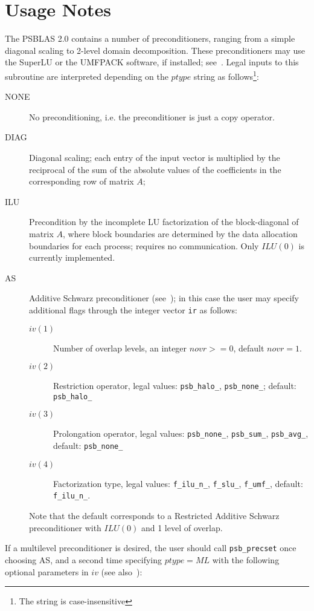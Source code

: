 \section*{Usage Notes}
The PSBLAS 2.0 contains a number of preconditioners, ranging from a
simple diagonal scaling to 2-level domain decomposition. These
preconditioners may use the SuperLU or the UMFPACK software, if
installed; see~\cite{SUPERLU,UMFPACK}. 
Legal inputs to this subroutine are interpreted depending on the
$ptype$ string as follows\footnote{The string is case-insensitive}:
\begin{description}
\item[NONE] No preconditioning, i.e. the preconditioner is just a copy
  operator.
\item[DIAG] Diagonal scaling; each entry of the input vector is
  multiplied by the reciprocal of the sum of the absolute values of
  the coefficients in the corresponding row of matrix  $A$;
\item[ILU] Precondition by the incomplete LU factorization of the
  block-diagonal of matrix $A$, where block boundaries are determined
  by the data allocation boundaries for each process; requires no
  communication. Only $ILU(0)$ is currently implemented. 
\item[AS] Additive Schwarz preconditioner (see~\cite{PARA04}); in this
  case the user may specify additional flags through the integer
  vector \verb|ir| as follows:
\begin{description}
\item[$iv(1)$] Number of overlap levels, an integer $novr>=0$, default
  $novr=1$.  
\item[$iv(2)$] Restriction operator, legal values: \verb|psb_halo_|,
  \verb|psb_none_|; default: \verb|psb_halo_|
\item[$iv(3)$] Prolongation operator, legal values: \verb|psb_none_|,
  \verb|psb_sum_|, \verb|psb_avg_|, default: \verb|psb_none_|
\item[$iv(4)$] Factorization type, legal values: \verb|f_ilu_n_|,
  \verb|f_slu_|, \verb|f_umf_|, default: \verb|f_ilu_n_|.
\end{description}
Note that the default corresponds to a Restricted Additive Schwarz
preconditioner with $ILU(0)$ and 1 level of overlap.
\end{description}
If a multilevel preconditioner is desired, the user should call
\verb|psb_precset| once choosing AS, and a second time specifying
$ptype=ML$ with the following optional parameters in $iv$ (see
also~\cite{APNUM,DD2}): 
